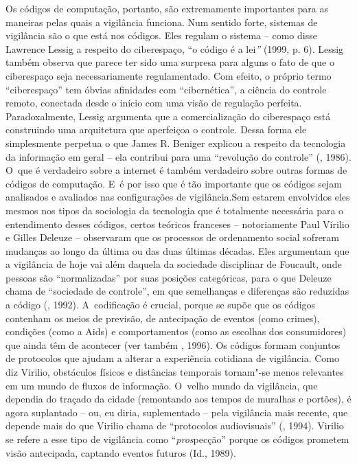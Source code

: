 Os códigos de computação, portanto, são extremamente importantes para as
maneiras pelas quais a vigilância funciona. Num sentido forte, sistemas
de vigilância são o que está nos códigos. Eles regulam o sistema --
como disse Lawrence Lessig a respeito do ciberespaço, ``o código é a
lei\emph{''} (1999, p. 6). Lessig também observa que parece ter sido uma
surpresa para alguns o fato de que o ciberespaço seja necessariamente
regulamentado. Com efeito, o próprio termo ``ciberespaço'' tem óbvias
afinidades com ``cibernética'', a ciência do controle remoto, conectada
desde o início com uma visão de regulação perfeita. Paradoxalmente,
Lessig argumenta que a comercialização do ciberespaço está construindo
uma arquitetura que aperfeiçoa o controle. Dessa forma ele simplesmente
perpetua o que James R. Beniger explicou a respeito da tecnologia da
informação em geral -- ela contribui para uma ``revolução do controle''
(, 1986). O~que é verdadeiro sobre a internet é também verdadeiro
sobre outras formas de códigos de computação. E~é por isso que é tão
importante que os códigos sejam analisados e avaliados nas configurações
de vigilância.Sem estarem envolvidos eles mesmos nos tipos da sociologia
da tecnologia que é totalmente necessária para o entendimento desses
códigos, certos teóricos franceses -- notoriamente Paul Virilio e
Gilles Deleuze -- observaram que os processos de ordenamento social
sofreram mudanças ao longo da última ou das duas últimas décadas. Eles
argumentam que a vigilância de hoje vai além daquela da sociedade
disciplinar de Foucault, onde pessoas são ``normalizadas'' por suas
posições categóricas, para o que Deleuze chama de ``sociedade de
controle'', em que semelhanças e diferenças são reduzidas a código
(, 1992). A~codificação é crucial, porque se supõe que os códigos
contenham os meios de previsão, de antecipação de eventos (como crimes),
condições (como a Aids) e comportamentos (como as escolhas dos
consumidores) que ainda têm de acontecer (ver também , 1996). Os
códigos formam conjuntos de protocolos que ajudam a alterar a
experiência cotidiana de vigilância. Como diz Virilio, obstáculos
físicos e distâncias temporais tornam"-se menos relevantes em um mundo de
fluxos de informação. O~velho mundo da vigilância, que dependia do
traçado da cidade (remontando aos tempos de muralhas e portões), é agora
suplantado -- ou, eu diria, suplementado -- pela vigilância mais
recente, que depende mais do que Virilio chama de ``protocolos
audiovisuais'' (, 1994). Virilio se refere a esse tipo de
vigilância como ``\emph{pros}pecção'' porque os códigos prometem visão
antecipada, captando eventos futuros (Id., 1989).

